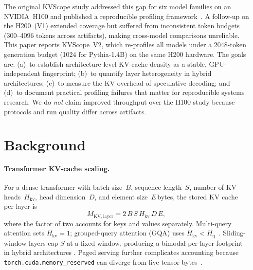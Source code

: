 \documentclass[11pt,a4paper]{article}
\begin{document}
The original KVScope study addressed this gap for six model
families on an NVIDIA~H100 and published a reproducible profiling
framework~\cite{kvscope2026h100}.
A follow-up on the H200~(V1) extended coverage but suffered from
inconsistent token budgets (300--4096 tokens across artifacts),
making cross-model comparisons unreliable.
This paper reports KVScope~V2, which re-profiles all models under
a 2048-token generation budget (1024 for Pythia-1.4B) on the same
H200 hardware.
The goals are:
(a)~to establish architecture-level KV-cache density as a stable,
GPU-independent fingerprint;
(b)~to quantify layer heterogeneity in hybrid architectures;
(c)~to measure the KV overhead of speculative decoding; and
(d)~to document practical profiling failures that matter for
reproducible systems research.
We do \emph{not} claim improved throughput over the H100 study
because protocols and run quality differ across artifacts.

\section{Background}
\label{sec:background}

\paragraph{Transformer KV-cache scaling.}
For a dense transformer with batch size~$B$, sequence
length~$S$, number of KV heads~$H_\mathrm{kv}$, head
dimension~$D$, and element size~$E$\,bytes, the stored KV cache
per layer is
\begin{equation}
  M_\mathrm{KV,layer} = 2\,B\,S\,H_\mathrm{kv}\,D\,E,
  \label{eq:kvcache}
\end{equation}
where the factor of two accounts for keys and values separately.
Multi-query attention sets $H_\mathrm{kv}=1$; grouped-query
attention (GQA) uses $H_\mathrm{kv}<H_\mathrm{q}$~\cite{shazeer2019mqa,ainslie2023gqa}.
Sliding-window layers cap $S$ at a fixed window, producing a
bimodal per-layer footprint in hybrid architectures
\cite{beltagy2020longformer}.
Paged serving further complicates accounting because
\texttt{torch.cuda.memory\_reserved} can diverge from live tensor
bytes~\cite{kwon2023pagedattention}.
\end{document}
